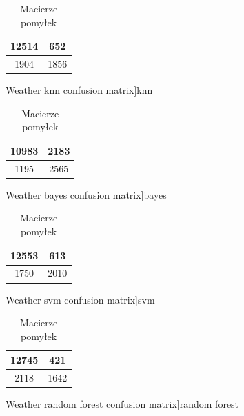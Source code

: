 \documentclass{classrep}
\begin{document}
{{{                \begin{table}[!htbp]
                    \begin{minipage}{.24\textwidth}
                        \centering
                        \begin{tabular}{|c|c|}
                            \hline
                            12514 & 652 \\ \hline
                            1904 & 1856 \\ \hline
                        \end{tabular}
                        \caption
                        [Weather knn confusion matrix]{knn}
                        \label{Weather_knn_confusion_matrix}
                    \end{minipage}
                    \hfill
                    \begin{minipage}{.24\textwidth}
                        \centering
                        \begin{tabular}{|c|c|}
                            \hline
                            10983 & 2183 \\ \hline
                            1195 & 2565 \\ \hline
                        \end{tabular}
                        \caption
                        [Weather bayes confusion matrix]{bayes}
                        \label{Weather_bayes_confusion_matrix}
                    \end{minipage}
                    \hfill
                    \begin{minipage}{.24\textwidth}
                        \centering
                        \begin{tabular}{|c|c|}
                            \hline
                            12553 & 613 \\ \hline
                            1750 & 2010 \\ \hline
                        \end{tabular}
                        \caption
                        [Weather svm confusion matrix]{svm}
                        \label{Weather_svm_confusion_matrix}
                    \end{minipage}
                    \hfill
                    \begin{minipage}{.24\textwidth}
                        \centering
                        \begin{tabular}{|c|c|}
                            \hline
                            12745 & 421 \\ \hline
                            2118 & 1642 \\ \hline
                        \end{tabular}
                        \caption
                        [Weather random forest confusion matrix]{random forest}
                        \label{Weather_random_forest_confusion_matrix}
                    \end{minipage}
                    \caption{Macierze pomyłek}
                \end{table}
                \FloatBarrier

}}}
\end{document}
